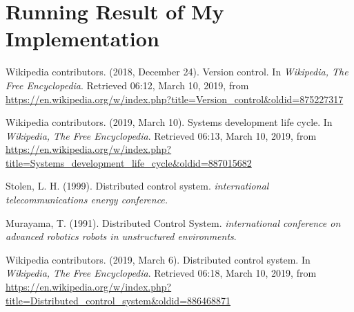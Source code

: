 \documentclass[a4paper]{report}
\begin{document}
\chapter{Running Result of My Implementation}






\begin{thebibliography}{A}

Wikipedia contributors. (2018, December 24). Version control. In \emph{Wikipedia, The Free Encyclopedia}. Retrieved 06:12, March 10, 2019, from \url{https://en.wikipedia.org/w/index.php?title=Version_control&oldid=875227317}

Wikipedia contributors. (2019, March 10). Systems development life cycle. In \emph{Wikipedia, The Free Encyclopedia}. Retrieved 06:13, March 10, 2019, from \url{https://en.wikipedia.org/w/index.php?title=Systems_development_life_cycle&oldid=887015682}

Stolen, L. H. (1999). Distributed control system. \emph{international telecommunications energy conference.}

Murayama, T. (1991). Distributed Control System. \emph{international conference on advanced robotics robots in unstructured environments}.

Wikipedia contributors. (2019, March 6). Distributed control system. In \emph{Wikipedia, The Free Encyclopedia}. Retrieved 06:18, March 10, 2019, from \url{https://en.wikipedia.org/w/index.php?title=Distributed_control_system&oldid=886468871}

\end{thebibliography}
\end{document}
